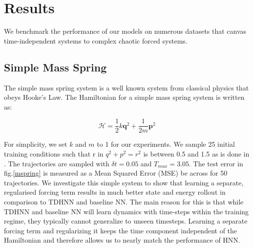 \documentclass[twoside]{article}
\begin{document}
\section{Results}

We benchmark the performance of our models on numerous datasets that canvas time-independent systems to complex chaotic forced systems.

\subsection{Simple Mass Spring}

The simple mass spring system is a well known system from classical physics that obeys Hooke's Law. The Hamiltonian for a simple mass spring system is written as:

\begin{equation}
\mathcal{H} = \frac{1}{2}k\mathbf{q}^2 + \frac{1}{2m}\mathbf{p}^2 
\end{equation}

For simplicity, we set $k$ and $m$ to 1 for our experiments. We sample 25 initial training conditions such that r in $q^2+p^2 = r^2$ is between 0.5 and 1.5 as is done in \cite{greydanus_hamiltonian_2019}. The trajectories are sampled with $\delta t =0.05$ and $T_{max} = 3.05$.  The test error in fig.\ref{mspring} is measured as a Mean Squared Error (MSE) be across for 50 trajectories. We investigate this simple system to show that learning a separate, regularised forcing term results in much better state and energy rollout in comparison to TDHNN and baseline NN. The main reason for this is that while TDHNN and baseline NN will learn dynamics with time-steps within the training regime, they typically cannot generalize to unseen timesteps. Learning a separate forcing term and regularizing it keeps the time component independent of the Hamiltonian and therefore allows us to nearly match the performance of HNN.
\end{document}
